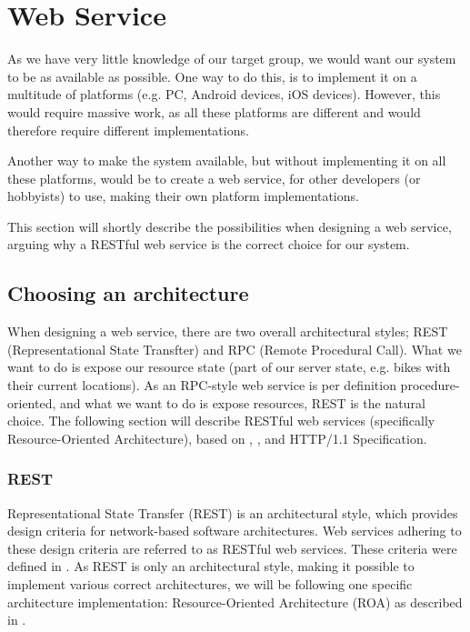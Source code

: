 \section{Web Service}
As we have very little knowledge of our target group, we would want our system to be as available as possible.
One way to do this, is to implement it on a multitude of platforms (e.g. PC, Android devices, iOS devices).
However, this would require massive work, as all these platforms are different and would therefore require different implementations.

Another way to make the system available, but without implementing it on all these platforms, would be to create a web service, for other developers (or hobbyists) to use, making their own platform implementations.

This section will shortly describe the possibilities when designing a web service, arguing why a RESTful web service is the correct choice for our system.

\subsection{Choosing an architecture}
When designing a web service, there are two overall architectural styles; REST (Representational State Transfter) and RPC (Remote Procedural Call).
What we want to do is expose our resource state (part of our server state, e.g. bikes with their current locations).
As an RPC-style web service is per definition procedure-oriented, and what we want to do is expose resources, REST is the natural choice.
The following section will describe RESTful web services (specifically Resource-Oriented Architecture), based on  \citet{restful_web_services}, \citet{fielding_dissertation}, and HTTP/1.1 Specification\cite{http_specification}.

\subsubsection{REST}
Representational State Transfer (REST) is an architectural style, which provides design criteria for network-based software architectures.
Web services adhering to these design criteria are referred to as RESTful web services.
These criteria were defined in \citet{fielding_dissertation}.
As REST is only an architectural style, making it possible to implement various correct architectures, we will be following one specific architecture implementation: Resource-Oriented Architecture (ROA) as described in \citet{restful_web_services}.

